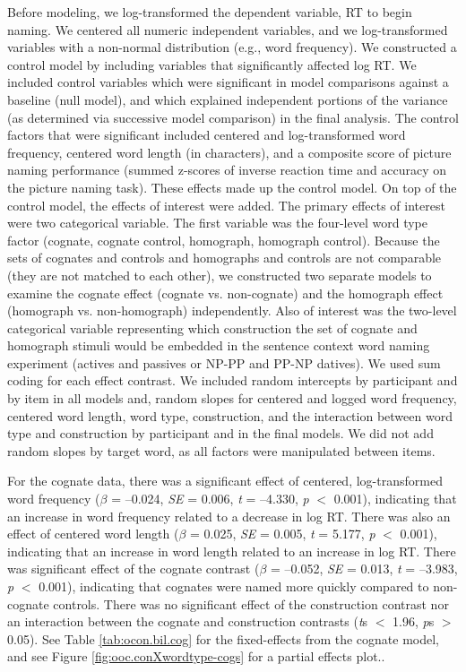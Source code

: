 Before modeling, we log-transformed the dependent variable, RT to begin naming. We centered all numeric independent variables, and we log-transformed variables with a non-normal distribution (e.g., word frequency). We constructed a control model by including variables that significantly affected log RT. We included control variables which were significant in model comparisons against a baseline (null model), and which explained independent portions of the variance (as determined via successive model comparison) in the final analysis. The control factors that were significant included centered and log-transformed word frequency, centered word length (in characters), and a composite score of picture naming performance (summed z-scores of inverse reaction time and accuracy on the picture naming task). These effects made up the control model. On top of the control model, the effects of interest were added. The primary effects of interest were two categorical variable. The first variable was the four-level word type factor (cognate, cognate control, homograph, homograph control). Because the sets of cognates and controls and homographs and controls are not comparable (they are not matched to each other), we constructed two separate models to examine the cognate effect (cognate vs. non-cognate) and the homograph effect (homograph vs. non-homograph) independently. Also of interest was the two-level categorical variable representing which construction the set of cognate and homograph stimuli would be embedded in the sentence context word naming experiment (actives and passives or NP-PP and PP-NP datives). We used sum coding for each effect contrast. We included random intercepts by participant and by item in all models and, random slopes for centered and logged word frequency, centered word length, word type, construction, and the interaction between word type and construction by participant and in the final models. We did not add random slopes by target word, as all factors were manipulated between items. 

For the cognate data, there was a significant effect of centered, log-transformed word frequency (\emph{$\beta$} = --0.024, \emph{SE} = 0.006, \emph{t} = --4.330, \emph{p} $<$ 0.001), indicating that an increase in word frequency related to a decrease in log RT. There was also an effect of centered word length (\emph{$\beta$} = 0.025, \emph{SE} = 0.005, \emph{t} = 5.177, \emph{p} $<$ 0.001), indicating that an increase in word length related to an increase in log RT. There was significant effect of the cognate contrast (\emph{$\beta$} = --0.052, \emph{SE} = 0.013, \emph{t} = --3.983, \emph{p} $<$ 0.001), indicating that cognates were named more quickly compared to non-cognate controls. There was no significant effect of the construction contrast nor an interaction between the cognate and construction contrasts (\emph{t}s $<$ 1.96, \emph{p}s $>$ 0.05). See Table \ref{tab:ocon.bil.cog} for the fixed-effects from the cognate model, and see Figure \ref{fig:ooc.conXwordtype-cogs} for a partial effects plot..

